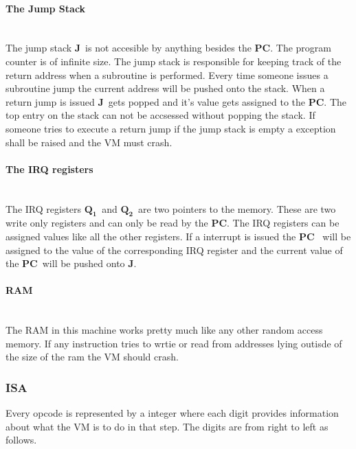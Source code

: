 \documentclass{article}
\newcommand{\q}{$\textbf{Q}_{\textbf{1}}$}
\newcommand{\qq}{$\textbf{Q}_{\textbf{2}}$}
\newcommand{\pc}{$\textbf{PC}$}
\newcommand{\J}{$\textbf{J}$}
\begin{document}
\paragraph{The Jump Stack} \
\\
The jump stack \J \ is not accesible by anything besides the \pc. The program
counter is of infinite size. The jump stack is responsible for keeping track
of the return address when a subroutine is performed. Every time someone
issues a subroutine jump the current address will be pushed onto the stack.
When a return jump is issued \J \ gets popped and it's value gets assigned to
the \pc. The top entry on the stack can not be accsessed without popping the
stack.
If someone tries to execute a return jump if the jump stack is empty a exception 
shall be raised and the VM must crash.

\paragraph{The IRQ registers} \
\\
The IRQ registers \q \ and \qq \ are two pointers to the memory. These are two
write only registers and can only be read by the \pc. The IRQ registers can be
assigned values like all the other registers.  If a interrupt is issued the \pc
\ will be assigned to the value of the corresponding IRQ register and the current
value of the \pc \ will be pushed onto \J.

\paragraph{RAM} \
\\
The RAM in this machine works pretty much like any other random access
memory. If any instruction tries to wrtie or read from addresses lying outisde
of the size of the ram the VM should crash.

\subsubsection{ISA}
Every opcode is represented by a integer where each digit provides
information about what the VM is to do in that step. The digits are from right
to left as follows.
\end{document}
